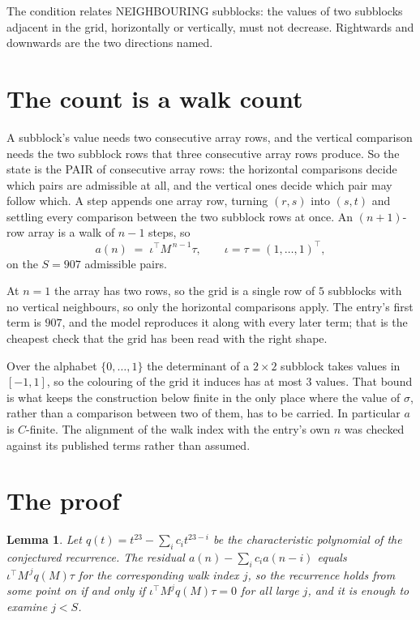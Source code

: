 \documentclass[11pt,a4paper]{article}
\theoremstyle{plain}
\newtheorem{lemma}[theorem]{Lemma}
\theoremstyle{definition}
\begin{document}
The condition relates NEIGHBOURING subblocks: the values of two subblocks adjacent in the grid,
horizontally or vertically, must not decrease. Rightwards and downwards are the two directions named.

\section{The count is a walk count}

A subblock's value needs two consecutive array rows, and the vertical
comparison needs the two subblock rows that three consecutive array rows produce. So the state
is the PAIR of consecutive array rows: the horizontal comparisons decide which pairs are
admissible at all, and the vertical ones decide which pair may follow which. A step appends one
array row, turning $(r,s)$ into $(s,t)$ and settling every comparison between the two subblock
rows at once. An $(n+1)$-row array is a walk of $n-1$ steps, so
\[
a(n)\;=\;\iota^{\!\top}M^{\,n-1}\tau,\qquad\iota=\tau=(1,\dots,1)^{\!\top},
\]
on the $S=907$ admissible pairs.

At $n=1$ the array has two rows, so the grid is a single row of $5$
subblocks with no vertical neighbours, so only the horizontal comparisons apply. The
entry's first term is $907$, and the model reproduces it along with every later term; that
is the cheapest check that the grid has been read with the right shape.

Over the alphabet $\{0,\dots,1\}$ the determinant of a $2\times2$ subblock takes values in
$[-1,1]$, so the colouring of the grid it induces has at most $3$ values.
That bound is what keeps the construction below finite in the only place where the value of
$\sigma$, rather than a comparison between two of them, has to be carried.
In particular $a$ is $C$-finite. The alignment of the walk index with the entry's own $n$ was
checked against its published terms rather than assumed.

\section{The proof}

\begin{lemma}\label{lem:crit}
Let $q(t)=t^{23}-\sum_i c_it^{23-i}$ be the characteristic polynomial of the
conjectured recurrence. The residual $a(n)-\sum_ic_ia(n-i)$ equals
$\iota^{\!\top}M^{\,j}q(M)\tau$ for the corresponding walk index $j$, so the recurrence
holds from some point on if and only if $\iota^{\!\top}M^{j}q(M)\tau=0$ for all large $j$,
and it is enough to examine $j<S$.
\end{lemma}
\end{document}

